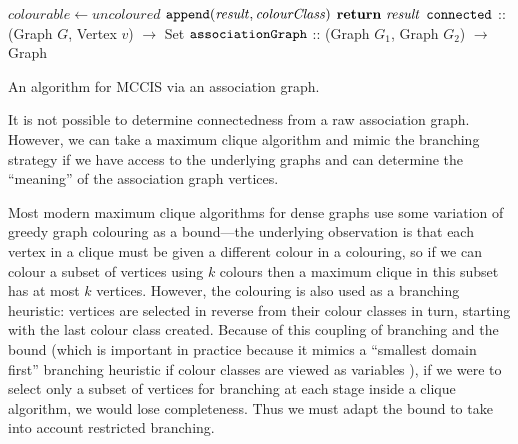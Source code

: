 \documentclass{llncs}
\begin{document}
\begin{algorithm}[p]
{{        \nl $\mathit{colourable} \gets \mathit{uncoloured}$ \;
        \nl {}
        \nl $\FuncSty{append}(\mathit{result}, \mathit{colourClass})$ \;
    }
    \nl $\KwSty{return} ~ \mathit{result}$ \;
}
\vspace{1ex}
\nl $\FuncSty{connected}$ :: (Graph $G$, Vertex $v$) $\rightarrow$ Set \;
\nl {}
\vspace{1ex}
\nl $\FuncSty{associationGraph}$ :: (Graph $G_1$, Graph $G_2$) $\rightarrow$ Graph \;
\nl {}
\caption{An algorithm for MCCIS via an association graph.}
\label{algorithm:mccis}
\end{algorithm}

It is not possible to determine connectedness from a raw association graph. However, we can take a
maximum clique algorithm and mimic the branching strategy if we have access to the underlying graphs
and can determine the ``meaning'' of the association graph vertices.

Most modern maximum clique algorithms for dense graphs use some variation of greedy graph colouring
as a bound---the underlying observation is that each vertex in a clique must be given a different
colour in a colouring, so if we can colour a subset of vertices using $k$ colours then a maximum
clique in this subset has at most $k$ vertices. However, the colouring is also used as a branching
heuristic: vertices are selected in reverse from their colour classes in turn, starting with the
last colour class created. Because of this coupling of branching and the bound (which is important
in practice because it mimics a ``smallest domain first'' branching heuristic if colour classes are
viewed as variables \cite{DBLP:conf/cp/McCreeshP14}), if we were to select only a subset of vertices for
branching at each stage inside a clique algorithm, we would lose completeness. Thus we must adapt
the bound to take into account restricted branching.
\end{document}
